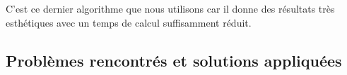 \documentclass{report}
\begin{document}
C’est ce dernier algorithme que nous utilisons car il donne des résultats très esthétiques avec un temps de calcul suffisamment réduit.


%
%

\subsection{Problèmes rencontrés et solutions appliquées}
\end{document}
